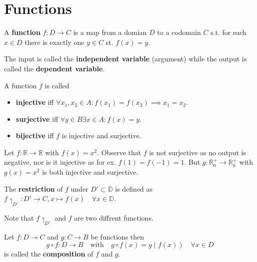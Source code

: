 \section{Functions}

\begin{definition}
    A \textbf{function} $f: D \to C$ is a map from a domian $D$ to a codomain $C$ s.t. for each $x \in D$ there is exactly one $y \in C$ st. $f(x) = y$.
\end{definition}

\begin{remark}
    The input is called the \textbf{independent variable} (argument) while the output is called the \textbf{dependent variable}.
\end{remark}

\begin{definition}
    A function $f$ is called
    \begin{itemize}
        \item \textbf{injective} iff $\forall x_1, x_2 \in A : f(x_1) = f(x_2) \implies x_1 = x_2$.
        \item \textbf{surjective} iff $\forall y \in B \exists x \in A : f(x) = y$.
        \item \textbf{bijective} iff $f$ is injective and surjective.
    \end{itemize}
\end{definition}

\begin{example}
    Let $f: \mathbb{R} \to \mathbb{R}$ with $f(x) = x^2$. Observe that $f$ is not surjective as no output is negative, nor is it injective as for ex. $f(1) = f(-1) = 1$. But $g: \mathbb{R}_{0}^+ \to \mathbb{R}_{0}^+$ with $g(x) = x^2$ is both injective and surjective.
\end{example}

\begin{definition}
    The \textbf{restriction} of $f$ under $D' \subset \mathbb{D}$ is defined as $f\upharpoonleft_{D'}: D' \to C, x \mapsto f(x) \quad \forall x \in \mathbb{D}$.
\end{definition}

\begin{remark}
    Note that $f\upharpoonleft_{D'}$ and $f$ are two diffrent functions.
\end{remark}

\begin{definition}
    Let $f: D \to C$ and $g: C \to B$ be functions then $$ g \circ f: D \to B \quad \text{with} \quad g \circ f(x) = g(f(x)) \quad \forall x \in D $$ is called the \textbf{composition} of $f$ and $g$.
\end{definition}

